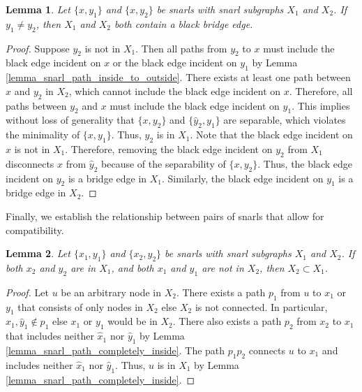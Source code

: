 \documentclass[11pt]{ucthesis}
\newtheorem{lemma}{Lemma}
\newtheorem*{proof}{Proof}
\begin{document}
\begin{lemma}
	Let $\{x, y_1\}$ and $\{x, y_2\}$ be snarls with snarl subgraphs $X_1$ and $X_2$. If $y_1 \neq y_2$, then $X_1$ and $X_2$ both contain a black bridge edge.
	\label{lemma_shared_boundary_implies_bridge_edge}
\end{lemma}
\begin{proof}
	Suppose $y_2$ is not in $X_1$. Then all paths from $y_2$ to $x$ must include the black edge incident on $x$ or the black edge incident on $y_1$ by Lemma \ref{lemma_snarl_path_inside_to_outside}. There exists at least one path between $x$ and $y_2$ in $X_2$, which cannot include the black edge incident on $x$. Therefore, all paths between $y_2$ and $x$ must include the black edge incident on $y_1$. This implies without loss of generality that $\{x, y_2\}$ and $\{\hat y_2, y_1\}$ are separable, which violates the minimality of $\{x, y_1\}$. Thus, $y_2$ is in $X_1$. Note that the black edge incident on $x$ is not in $X_1$. Therefore, removing the black edge incident on $y_2$ from $X_1$ disconnects $x$ from $\hat y_2$ because of the separability of $\{x, y_2\}$. Thus, the black edge incident on $y_2$ is a bridge edge in $X_1$. Similarly, the black edge incident on $y_1$ is a bridge edge in $X_2$.
\end{proof}

Finally, we establish the relationship between pairs of snarls that allow for compatibility.

\begin{lemma}
	Let $\{x_1, y_1\}$ and $\{x_2, y_2\}$ be snarls with snarl subgraphs $X_1$ and $X_2$. If both $x_2$ and $y_2$ are in $X_1$, and both $x_1$ and $y_1$ are not in $X_2$, then $X_2 \subset X_1$.
	\label{lemma_nested_boundaries_implies_nested_snarls}
\end{lemma}
\begin{proof}
	Let $u$ be an arbitrary node in $X_2$. There exists a path $p_1$ from $u$ to $x_1$ or $y_1$ that consists of only nodes in $X_2$ else $X_2$ is not connected. In particular, $\hat x_1, \hat y_1 \notin p_1$ else $x_1$ or $y_1$ would be in $X_2$. There also exists a path $p_2$ from $x_2$ to $x_1$ that includes neither $\hat x_1$ nor $\hat y_1$ by Lemma \ref{lemma_snarl_path_completely_inside}. The path $p_1p_2$ connects $u$ to $x_1$ and includes neither $\hat x_1$ nor $\hat y_1$. Thus, $u$ is in $X_1$ by Lemma \ref{lemma_snarl_path_completely_inside}.
\end{proof}
\end{document}
